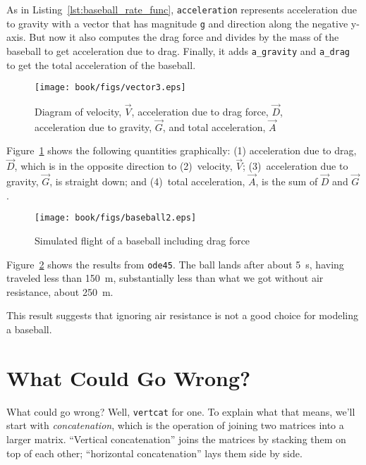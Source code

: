 As in Listing~\ref{lst:baseball_rate_func}, \lstinline{acceleration} represents acceleration due to gravity with a vector that has magnitude \lstinline{g} and direction along the negative y-axis.
But now it also computes the drag force and divides by the mass of the baseball to get acceleration due to drag.
Finally, it adds \lstinline{a_gravity} and \lstinline{a_drag} to get the total acceleration of the baseball.

\begin{figure}[ht]
\centerline{\texttt{[image: book/figs/vector3.eps]}}
\caption{Diagram of velocity, $\vec{V}$, acceleration due to drag force, 
$\vec{D}$, acceleration due to gravity, $\vec{G}$, and total acceleration, $\vec{A}$}
\label{fig:vector3}
\end{figure}

Figure~\ref{fig:vector3} shows the following quantities graphically:  (1) acceleration due to drag, $\vec{D}$, which is in the opposite direction to (2)~velocity, $\vec{V}$; (3)~acceleration due to gravity, $\vec{G}$, is straight down; and (4)~total acceleration, $\vec{A}$, is the sum of $\vec{D}$ and $\vec{G}$.


\begin{figure}
\centerline{\texttt{[image: book/figs/baseball2.eps]}}
\caption{Simulated flight of a baseball including drag force}
\label{fig:baseball2}
\end{figure}

Figure~\ref{fig:baseball2} shows the results from \lstinline{ode45}.  The ball lands after about \SI{5}{\second}, having traveled less than \SI{150}{\meter}, substantially less than what we got without air resistance, about \SI{250}{\meter}.

This result suggests that ignoring air resistance is not a good choice for modeling a baseball.


\section{What Could Go Wrong?}

What could go wrong?  Well, \lstinline{vertcat} for one.  To explain
what that means, we'll start with \emph{concatenation}, which is
the operation of joining two matrices into a larger matrix.
``Vertical concatenation'' joins the matrices by stacking them on
top of each other; ``horizontal concatenation'' lays them
side by side.

